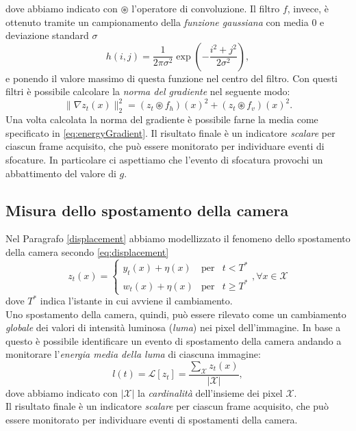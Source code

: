 dove abbiamo indicato con $\circledast$ l'operatore di convoluzione.
Il filtro $f$, invece, \`e ottenuto tramite un campionamento della \textit{funzione gaussiana} con media $0$ e deviazione standard $\sigma$
\begin{equation}
\label{eq:gaussian}
h(i,j)=\frac{1}{2\pi\sigma^2}\exp\left(-\frac{i^2+j^2}{2\sigma^2}\right),
\end{equation}
e ponendo il valore massimo di questa funzione nel centro del filtro.
Con questi filtri \`e possibile calcolare la \textit{norma del gradiente} nel seguente modo:
\begin{equation}
\label{eq:normaGradiente}
\| \nabla z_t(x) \|_2^2=\left(z_t \circledast f_h\right)(x)^2 + \left(z_t \circledast f_v\right)(x)^2.
\end{equation}
Una volta calcolata la norma del gradiente \`e possibile farne la media come specificato in \eqref{eq:energyGradient}.
Il risultato finale \`e un indicatore \textit{scalare} per ciascun frame acquisito, che pu\`o essere monitorato per individuare eventi di sfocature. 
In particolare ci aspettiamo che l'evento di sfocatura provochi un abbattimento del valore di $g$.
\subsection{Misura dello spostamento della camera}
Nel Paragrafo \ref{displacement} abbiamo modellizzato il fenomeno dello spostamento della camera secondo  \eqref{eq:displacement}
\[z_t(x)  = \left\{ \begin{array}{rcl}
y_t(x) + \eta(x) & \mbox{per} & t < T^* \\
w_t(x) + \eta(x) & \mbox{per} & t \geqslant T^*
\end{array}\right. , \forall x \in \mathcal{X}\]
dove $T^*$ indica l'istante in cui avviene il cambiamento.\\
Uno spostamento della camera, quindi, pu\`o essere rilevato come un cambiamento \textit{globale} dei valori di intensit\`a luminosa (\textit{luma}) nei pixel dell'immagine.
In base a questo \`e possibile identificare un evento di spostamento della camera andando a monitorare l'\textit{energia media della luma} di ciascuna immagine:
\begin{equation}
\label{eq:energyLuma}
l(t) = \mathcal{L}[z_t] =\frac{\sum_{\mathcal{X}} z_t(x) }{|\mathcal{X}|} ,
\end{equation}  
dove abbiamo indicato con $|\mathcal{X}|$ la \textit{cardinalit\`a} dell'insieme dei pixel $\mathcal{X}$.\\
Il risultato finale \`e un indicatore \textit{scalare} per ciascun frame acquisito, che pu\`o essere monitorato per individuare eventi di spostamenti della camera. 
